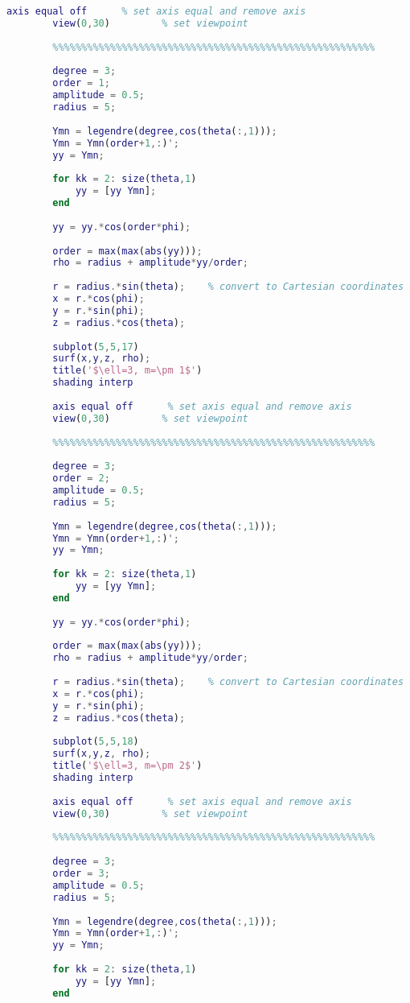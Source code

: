 \begin{lstlisting}[language=MATLAB]
		axis equal off      % set axis equal and remove axis
		view(0,30)         % set viewpoint
		
		%%%%%%%%%%%%%%%%%%%%%%%%%%%%%%%%%%%%%%%%%%%%%%%%%%%%%%%%
		
		degree = 3;
		order = 1;
		amplitude = 0.5;
		radius = 5;
		
		Ymn = legendre(degree,cos(theta(:,1)));
		Ymn = Ymn(order+1,:)';
		yy = Ymn;
		
		for kk = 2: size(theta,1)
		    yy = [yy Ymn];
		end
		
		yy = yy.*cos(order*phi);
		
		order = max(max(abs(yy)));
		rho = radius + amplitude*yy/order;
		
		r = radius.*sin(theta);    % convert to Cartesian coordinates
		x = r.*cos(phi);
		y = r.*sin(phi);
		z = radius.*cos(theta);
		
		subplot(5,5,17)
		surf(x,y,z, rho);
		title('$\ell=3, m=\pm 1$')
		shading interp
		
		axis equal off      % set axis equal and remove axis
		view(0,30)         % set viewpoint
		
		%%%%%%%%%%%%%%%%%%%%%%%%%%%%%%%%%%%%%%%%%%%%%%%%%%%%%%%%
		
		degree = 3;
		order = 2;
		amplitude = 0.5;
		radius = 5;
		
		Ymn = legendre(degree,cos(theta(:,1)));
		Ymn = Ymn(order+1,:)';
		yy = Ymn;
		
		for kk = 2: size(theta,1)
		    yy = [yy Ymn];
		end
		
		yy = yy.*cos(order*phi);
		
		order = max(max(abs(yy)));
		rho = radius + amplitude*yy/order;
		
		r = radius.*sin(theta);    % convert to Cartesian coordinates
		x = r.*cos(phi);
		y = r.*sin(phi);
		z = radius.*cos(theta);
		
		subplot(5,5,18)
		surf(x,y,z, rho);
		title('$\ell=3, m=\pm 2$')
		shading interp
		
		axis equal off      % set axis equal and remove axis
		view(0,30)         % set viewpoint
		
		%%%%%%%%%%%%%%%%%%%%%%%%%%%%%%%%%%%%%%%%%%%%%%%%%%%%%%%%
		
		degree = 3;
		order = 3;
		amplitude = 0.5;
		radius = 5;
		
		Ymn = legendre(degree,cos(theta(:,1)));
		Ymn = Ymn(order+1,:)';
		yy = Ymn;
		
		for kk = 2: size(theta,1)
		    yy = [yy Ymn];
		end
		

\end{lstlisting}
